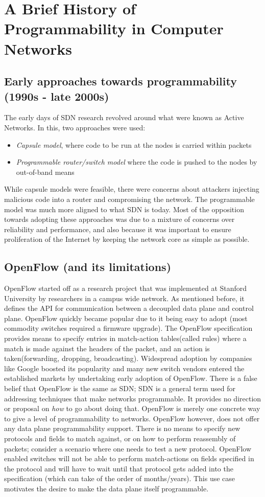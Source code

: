 \section{A Brief History of Programmability in Computer Networks}
\subsection{Early approaches towards programmability (1990s - late 2000s)}
The early days of SDN research revolved around what were known as Active Networks. In this, two approaches were used:
\begin{itemize}
  \item \textit{Capsule model}, where code to be run at the nodes is carried within packets
  \item \textit{Programmable router/switch model} where the code is pushed to the nodes by out-of-band means 
\end{itemize}

While capsule models were feasible, there were concerns about attackers injecting malicious code into a router and compromising
the network. The programmable model was much more aligned to what SDN is today. Most of the opposition towards adopting these approaches 
was due to a mixture of concerns over reliability and performance, and also because it was important to ensure proliferation
of the Internet by keeping the network core as simple as possible.
\subsection{OpenFlow (and its limitations)}
OpenFlow started off as a research project that was implemented at Stanford University by researchers in a campus wide network. As 
mentioned before, it defines the API for communication between a decoupled data plane and control plane. OpenFlow quickly became
popular due to it being easy to adopt (most commodity switches required a firmware upgrade). The OpenFlow specification provides 
means to specify entries in match-action tables(called rules) where a match is made against the headers of the packet, and an
action is taken(forwarding, dropping, broadcasting). Widespread adoption by companies like Google boosted its popularity
and many new switch vendors entered the established markets by undertaking early adoption of OpenFlow.
There is a false belief that OpenFlow is the same as SDN; SDN is a general term used for addressing techniques that make networks programmable.
It provides no direction or proposal on \textit{how} to go about doing that.
OpenFlow is merely one concrete way to give a level of programmability to networks.
\newline
OpenFlow however, does not offer any data plane programmability support. There is no means to specify new protocols and fields to 
match against, or on how to perform reassembly of packets; consider a scenario where one needs to test a new protocol. OpenFlow
enabled switches will not be able to perform match-actions on fields specified in the protocol and will have to wait until that
protocol gets added into the specification (which can take of the order of months/years). This use case motivates the desire to make the
data plane itself programmable.
